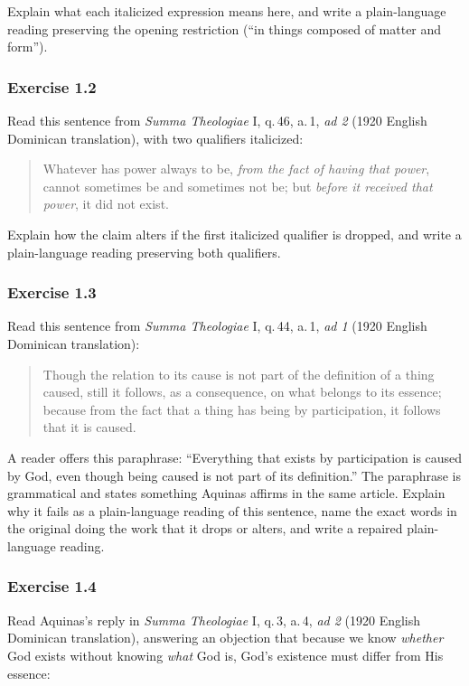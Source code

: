 Explain what each italicized expression means here, and write a plain-language reading preserving the opening restriction (``in things composed of matter and form'').

\subsubsection*{Exercise 1.2}
Read this sentence from \emph{Summa Theologiae} I, q.\,46, a.\,1, \emph{ad 2} (1920 English Dominican translation), with two qualifiers italicized:

\begin{quote}
Whatever has power always to be, \emph{from the fact of having that power}, cannot sometimes be and sometimes not be; but \emph{before it received that power}, it did not exist.
\end{quote}

Explain how the claim alters if the first italicized qualifier is dropped, and write a plain-language reading preserving both qualifiers.

\subsubsection*{Exercise 1.3}
Read this sentence from \emph{Summa Theologiae} I, q.\,44, a.\,1, \emph{ad 1} (1920 English Dominican translation):

\begin{quote}
Though the relation to its cause is not part of the definition of a thing caused, still it follows, as a consequence, on what belongs to its essence; because from the fact that a thing has being by participation, it follows that it is caused.
\end{quote}

A reader offers this paraphrase: ``Everything that exists by participation is caused by God, even though being caused is not part of its definition.'' The paraphrase is grammatical and states something Aquinas affirms in the same article. Explain why it fails as a plain-language reading of this sentence, name the exact words in the original doing the work that it drops or alters, and write a repaired plain-language reading.

\subsubsection*{Exercise 1.4}
Read Aquinas's reply in \emph{Summa Theologiae} I, q.\,3, a.\,4, \emph{ad 2} (1920 English Dominican translation), answering an objection that because we know \emph{whether} God exists without knowing \emph{what} God is, God's existence must differ from His essence:

